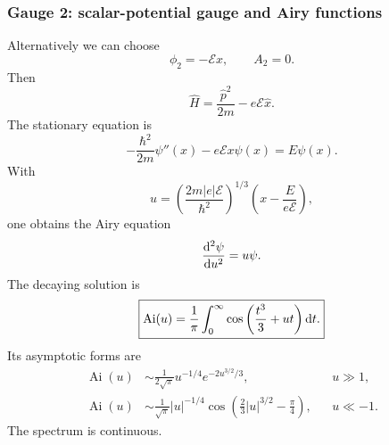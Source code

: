 \subsubsection{Gauge 2: scalar-potential gauge and Airy functions}
Alternatively we can choose
\begin{equation}
\phi_2=-\mathcal Ex,
\qquad
A_2=0.
\end{equation}
Then
\begin{equation}
\hat H=\frac{\hat p^2}{2m}-e\mathcal E\hat x.
\end{equation}
The stationary equation is
\begin{equation}
-\frac{\hbar^2}{2m}\psi''(x)-e\mathcal Ex\psi(x)=E\psi(x).
\end{equation}
With
\begin{equation}
u=\left(\frac{2m|e|\mathcal E}{\hbar^2}\right)^{1/3}
\left(x-\frac{E}{e\mathcal E}\right),
\end{equation}
one obtains the Airy equation
\begin{equation}
\frac{\mathrm{d}^2\psi}{\mathrm{d} u^2}=u\psi.
\end{equation}
The decaying solution is
\begin{equation}
\boxed{
\operatorname{Ai}(u)=\frac1\pi\int_0^\infty
\cos\left(\frac{t^3}{3}+ut\right)\mathrm{d} t.}
\end{equation}
Its asymptotic forms are
\begin{align}
\operatorname{Ai}(u)&\sim
\frac{1}{2\sqrt\pi}u^{-1/4}e^{-2u^{3/2}/3},
&&u\gg1,\\
\operatorname{Ai}(u)&\sim
\frac{1}{\sqrt\pi}|u|^{-1/4}
\cos\left(\frac23|u|^{3/2}-\frac\pi4\right),
&&u\ll-1.
\end{align}
The spectrum is continuous.

